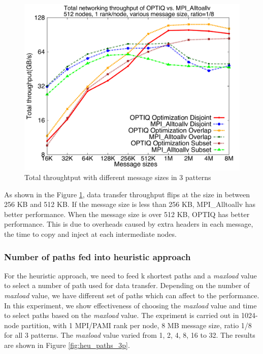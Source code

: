 \begin{figure}[!htb]
\vspace{-0.1in}
\centering
\includegraphics[scale=0.30]{figures/messagesize.pdf}
\vspace{-0.1in}
\caption{Total throughtput with different message sizes in 3 patterns}
\vspace{-0.1in}
\label{fig:messagesize}
\end{figure}

As shown in the Figure \ref{fig:messagesize}, data transfer throughput flips at the size in between 256 KB and 512 KB. If the message size is less than 256 KB, MPI\_Alltoallv has better performance. When the message size is over 512 KB, OPTIQ has better performance. This is due to overheads caused by extra headers in each message, the time to copy and inject at each intermediate nodes.

\subsubsection{Number of paths fed into heuristic approach}

For the heuristic approach, we need to feed k shortest paths and a \textit{maxload} value to select a number of path used for data transfer. Depending on the number of \textit{maxload} value, we have different set of paths which can affect to the performance.  In this experiment, we show effectiveness of choosing the \textit{maxload} value and time to select paths based on the \textit{maxload} value. The expriment is carried out in 1024-node partition, with 1 MPI/PAMI rank per node, 8 MB message size, ratio 1/8 for all 3 patterns. The \textit{maxload} value varied from 1, 2, 4, 8, 16 to 32. The results are shown in Figure \ref{fig:heu_paths_3p}. 

